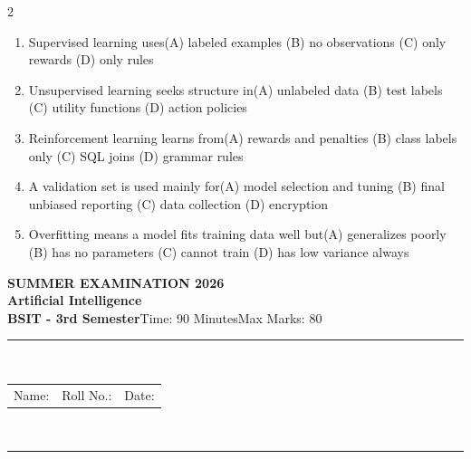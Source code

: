 \documentclass[a4paper]{article}
\makeatletter
\newcommand{\examheader}{%
\begin{center}\textbf{\large SUMMER EXAMINATION 2026}\\[-1pt]
\textbf{\normalsize Artificial Intelligence}\\[-1pt]
\textbf{BSIT - 3rd Semester}\quad Time: 90 Minutes\quad Max Marks: 80\\[-1pt]
\textcolor{black!65}{\rule{\linewidth}{0.45pt}}\\[-2pt]
\begin{tabularx}{\linewidth}{@{}X X X@{}}Name: \hrulefill & Roll No.: \hrulefill & Date: \hrulefill\end{tabularx}\\[-1pt]
\textcolor{black!65}{\rule{\linewidth}{0.45pt}}\end{center}}
\makeatother
\begin{document}
\begin{multicols*}{2}
\begin{enumerate}
\item Supervised learning uses\newline\hspace*{0.6em}(A) labeled examples \quad (B) no observations \newline\hspace*{0.6em}(C) only rewards \quad (D) only rules
\item Unsupervised learning seeks structure in\newline\hspace*{0.6em}(A) unlabeled data \quad (B) test labels \newline\hspace*{0.6em}(C) utility functions \quad (D) action policies
\item Reinforcement learning learns from\newline\hspace*{0.6em}(A) rewards and penalties \quad (B) class labels only \newline\hspace*{0.6em}(C) SQL joins \quad (D) grammar rules
\item A validation set is used mainly for\newline\hspace*{0.6em}(A) model selection and tuning \quad (B) final unbiased reporting \newline\hspace*{0.6em}(C) data collection \quad (D) encryption
\item Overfitting means a model fits training data well but\newline\hspace*{0.6em}(A) generalizes poorly \quad (B) has no parameters \newline\hspace*{0.6em}(C) cannot train \quad (D) has low variance always
\end{enumerate}
\end{multicols*}
\newpage
\examheader
\raggedcolumns
\end{document}
